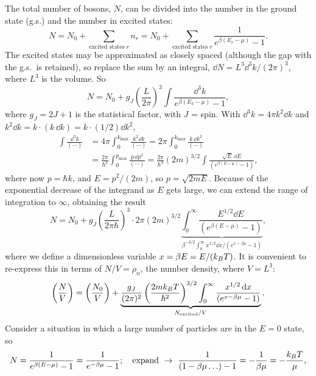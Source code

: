 The total number of bosons, $N$, can be divided into the number in the ground state (g.s.) and the number in excited states:
\begin{equation}
  N = N_0 + \sum_{\text{excited states }r}n_r = N_0 + \sum_{\text{excited states }r}\frac{1}{e^{\beta(E_r-\mu)}-1}.
\end{equation}
The excited states may be approximated as closely spaced (although the gap with the g.s.\ is retained), so replace the sum by an
integral, $\dd N = L^3\dd^3k/(2\pi)^3$, where $L^3$ is the volume. So
\begin{equation}
  N = N_0 + g_J\left(\frac{L}{2\pi}\right)^3\int\frac{\dd^3k}{e^{\beta(E_k-\mu)}-1},
\end{equation}
where $g_J = 2J+1$ is the statistical factor, with $J$ = spin. With $\dd^3k = 4\pi k^2\dd k$ and
$k^2\dd k = k\cdot(k\,\dd k) = k\cdot(1/2)\dd k^2$,
\begin{align}
  \int\frac{\dd^3k}{(\cdots)} &= 4\pi\int_0^{k_{\max}}\frac{k^2\dd k}{(\cdots)} = 2\pi\int_0^{k_{\max}}\frac{k\,\dd k^2}{(\cdots)}\nonumber\\
  &= \frac{2\pi}{\hbar^3}\int_0^{p_{\max}}\frac{p\,\dd p^2}{(\cdots)} = \frac{2\pi}{\hbar^3}(2m)^{3/2}\int\frac{\sqrt E\,\dd E}{(e^{\beta(E-\mu)}-1)},
\end{align}
where now $p = \hbar k$, and $E = p^2/(2m)$, so $p = \sqrt{2mE}$. Because of the exponential decrease of the integrand as $E$
gets large, we can extend the range of integration to $\infty$, obtaining the result
\begin{equation}
  N = N_0 + g_J\left(\frac{L}{2\pi\hbar}\right)^3\cdot 2\pi(2m)^{3/2}\underbrace{\int_0^\infty\frac{E^{1/2}\dd E}{(e^{\beta(E-\mu)}-1)}}_{\beta^{-3/2}\int_0^\infty x^{1/2}\dd x/(e^{x-\beta\mu}-1)},
\end{equation}
where we define a dimensionless variable $x = \beta E = E/(k_{B} T)$. It is convenient to re-express this in terms of
$N/V = \rho_n$, the number density, where $V = L^3$:
\begin{equation}
  \left(\frac{N}{V}\right) = \left(\frac{N_0}{V}\right) + \underbrace{\frac{g_J}{(2\pi)^2}\left(\frac{2mk_{B} T}{\hbar^2}\right)^{3/2}\int_0^\infty\frac{x^{1/2}\mathop{}\!\mathrm{d} x}{(e^{x-\beta\mu}-1)}}_{N_{\text{excited}}/V}.
\end{equation}
Consider a situation in which a large number of particles are in the $E = 0$ state, so
\begin{equation}
  N = \frac{1}{e^{\beta(E-\mu)}-1} = \frac{1}{e^{-\beta\mu}-1};\quad\text{expand}\ \to\ \frac{1}{(1-\beta\mu\ldots)-1} = -\frac{1}{\beta\mu} = -\frac{\kB T}{\mu},
\end{equation}

